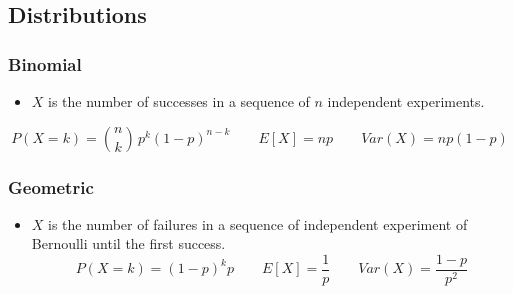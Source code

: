 \subsection{Distributions}
\subsubsection{Binomial}

\begin{itemize}
\item  $X$ is the number of successes in a sequence of $n$ independent experiments.
\end{itemize}
$$P(X = k) = \binom{n}{k}\,p^{k}(1-p)^{n-k} \qquad E[X] = np \qquad Var(X) = np(1-p)$$

\subsubsection{Geometric}
\begin{itemize}
\item $X$ is the number of failures in a sequence of independent experiment of Bernoulli until the first success.
$$P(X = k) = (1-p)^{k}p \qquad E[X] = \frac{1}{p} \qquad Var(X) = \frac{1-p}{p^2}$$

\end{itemize}
